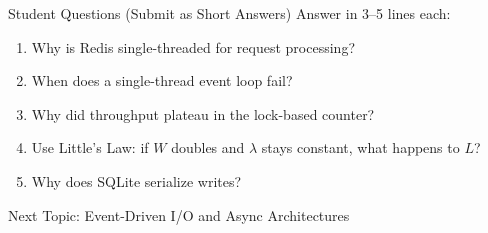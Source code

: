 \documentclass[11pt]{beamer}
\begin{document}
	\begin{frame}{Student Questions (Submit as Short Answers)}
		Answer in 3--5 lines each:
		\begin{enumerate}
			\item Why is Redis single-threaded for request processing?
			\item When does a single-thread event loop fail?
			\item Why did throughput plateau in the lock-based counter?
			\item Use Little's Law: if $W$ doubles and $\lambda$ stays constant, what happens to $L$?
			\item Why does SQLite serialize writes?
		\end{enumerate}
	\end{frame}
	
	\begin{frame}
		\centering
		\Large Next Topic: Event-Driven I/O and Async Architectures
	\end{frame}
	
\end{document}
